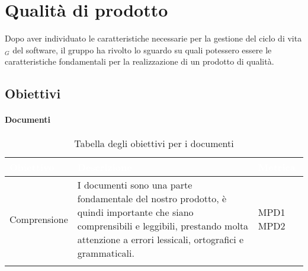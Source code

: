\chapter{Qualità di prodotto}
Dopo aver individuato le caratteristiche necessarie per la gestione del ciclo di vita$_G$ del software, il gruppo ha rivolto lo sguardo su quali potessero essere le caratteristiche fondamentali per la realizzazione di un prodotto di qualità.
\section{Obiettivi}
\subsubsection{Documenti}

\begin{center}
  \renewcommand{\arraystretch}{1.25}
  \begin{longtable}{|p{3cm}|p{7.5cm}|p{2cm}|} \hline
  \rowcolor[HTML]{036400}
  \textcolor{white}{\textbf{Obiettivo}} & \textcolor{white}{\textbf{Descrizione}} & \textcolor{white}{\textbf{Metrica}} \\[0.2em] \hline
  \rowcolor[HTML]{EFEFEF}
    Comprensione & I documenti sono una parte fondamentale del nostro prodotto, è quindi importante che siano comprensibili e leggibili, prestando molta attenzione a errori lessicali, ortografici e grammaticali.  & MPD1 \newline MPD2       \\ \hline
    \caption{Tabella degli obiettivi per i documenti}
  \end{longtable}
\end{center}


